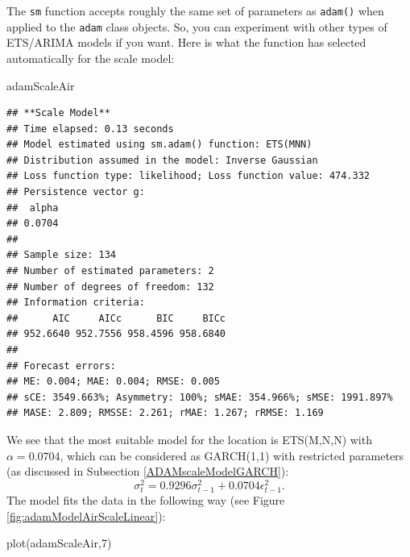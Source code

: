 \documentclass[
]{book}
\newenvironment{Shaded}{\begin{snugshade}}{\end{snugshade}}
\newcommand{\DecValTok}[1]{\textcolor[rgb]{0.00,0.00,0.81}{#1}}
\newcommand{\FunctionTok}[1]{\textcolor[rgb]{0.00,0.00,0.00}{#1}}
\newcommand{\NormalTok}[1]{#1}
\theoremstyle{definition}
\theoremstyle{definition}
\theoremstyle{definition}
\theoremstyle{definition}
\theoremstyle{remark}
\begin{document}
The \texttt{sm} function accepts roughly the same set of parameters as \texttt{adam()} when applied to the \texttt{adam} class objects. So, you can experiment with other types of ETS/ARIMA models if you want. Here is what the function has selected automatically for the scale model:

\begin{Shaded}
\begin{Highlighting}[]
\NormalTok{adamScaleAir}
\end{Highlighting}
\end{Shaded}

\begin{verbatim}
## **Scale Model**
## Time elapsed: 0.13 seconds
## Model estimated using sm.adam() function: ETS(MNN)
## Distribution assumed in the model: Inverse Gaussian
## Loss function type: likelihood; Loss function value: 474.332
## Persistence vector g:
##  alpha 
## 0.0704 
## 
## Sample size: 134
## Number of estimated parameters: 2
## Number of degrees of freedom: 132
## Information criteria:
##      AIC     AICc      BIC     BICc 
## 952.6640 952.7556 958.4596 958.6840 
## 
## Forecast errors:
## ME: 0.004; MAE: 0.004; RMSE: 0.005
## sCE: 3549.663%; Asymmetry: 100%; sMAE: 354.966%; sMSE: 1991.897%
## MASE: 2.809; RMSSE: 2.261; rMAE: 1.267; rRMSE: 1.169
\end{verbatim}

We see that the most suitable model for the location is ETS(M,N,N) with \(\alpha=0.0704\), which can be considered as GARCH(1,1) with restricted parameters (as discussed in Subsection \ref{ADAMscaleModelGARCH}):
\begin{equation*}
    \sigma_t^2 = 0.9296 \sigma_{t-1}^2 + 0.0704 \epsilon_{t-1}^2 .
\end{equation*}
The model fits the data in the following way (see Figure \ref{fig:adamModelAirScaleLinear}):

\begin{Shaded}
\begin{Highlighting}[]
\FunctionTok{plot}\NormalTok{(adamScaleAir,}\DecValTok{7}\NormalTok{)}
\end{Highlighting}
\end{Shaded}
\end{document}
